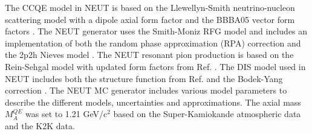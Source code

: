 The CCQE model in NEUT is based on the Llewellyn-Smith neutrino-nucleon scattering model \citep{LSmith}
with a dipole axial form factor and the BBBA05 vector form factors \citep{RBradford}.
The NEUT generator uses the Smith-Moniz RFG model \citep{RSmith}
and includes an implementation of both the random phase approximation (RPA) correction \citep{JNieves}
and the 2p2h Nieves model \citep{JNieves}.
The NEUT resonant pion production is based on the Rein-Sehgal model \citep{DRein}
with updated form factors from Ref. \citep{KGraczyk}.
The DIS model
used in NEUT includes both the structure function from Ref. \citep{MGluck}
and the Bodek-Yang correction \citep{ABodek}.
The NEUT MC generator includes various model parameters to describe the different models, uncertainties and approximations. 
The axial mass $M_A^{QE}$ 
was set to 1.21 GeV/c$^2$ based on the Super-Kamiokande atmospheric data and the K2K data.
